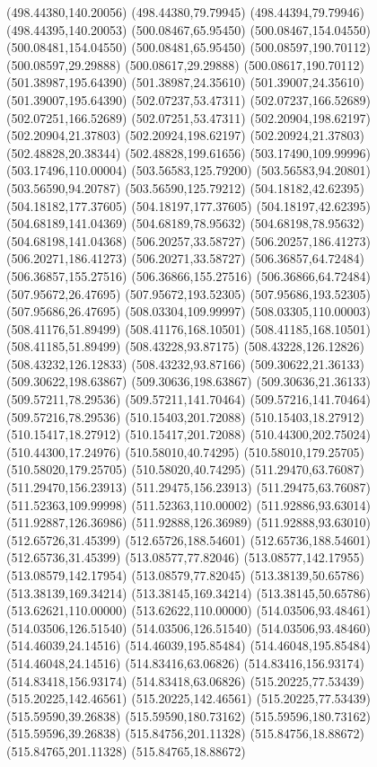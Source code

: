 {(498.44380,140.20056) (498.44380,79.79945) (498.44394,79.79946) (498.44395,140.20053) (500.08467,65.95450) (500.08467,154.04550) (500.08481,154.04550) (500.08481,65.95450)
(500.08597,190.70112) (500.08597,29.29888) (500.08617,29.29888) (500.08617,190.70112) (501.38987,195.64390) (501.38987,24.35610) (501.39007,24.35610) (501.39007,195.64390)
(502.07237,53.47311) (502.07237,166.52689) (502.07251,166.52689) (502.07251,53.47311) (502.20904,198.62197) (502.20904,21.37803) (502.20924,198.62197) (502.20924,21.37803)
(502.48828,20.38344) (502.48828,199.61656) (503.17490,109.99996) (503.17496,110.00004) (503.56583,125.79200) (503.56583,94.20801) (503.56590,94.20787) (503.56590,125.79212)
(504.18182,42.62395) (504.18182,177.37605) (504.18197,177.37605) (504.18197,42.62395) (504.68189,141.04369) (504.68189,78.95632) (504.68198,78.95632) (504.68198,141.04368)
(506.20257,33.58727) (506.20257,186.41273) (506.20271,186.41273) (506.20271,33.58727) (506.36857,64.72484) (506.36857,155.27516) (506.36866,155.27516) (506.36866,64.72484)
(507.95672,26.47695) (507.95672,193.52305) (507.95686,193.52305) (507.95686,26.47695) (508.03304,109.99997) (508.03305,110.00003) (508.41176,51.89499) (508.41176,168.10501)
(508.41185,168.10501) (508.41185,51.89499) (508.43228,93.87175) (508.43228,126.12826) (508.43232,126.12833) (508.43232,93.87166) (509.30622,21.36133) (509.30622,198.63867)
(509.30636,198.63867) (509.30636,21.36133) (509.57211,78.29536) (509.57211,141.70464) (509.57216,141.70464) (509.57216,78.29536) (510.15403,201.72088) (510.15403,18.27912)
(510.15417,18.27912) (510.15417,201.72088) (510.44300,202.75024) (510.44300,17.24976) (510.58010,40.74295) (510.58010,179.25705) (510.58020,179.25705) (510.58020,40.74295)
(511.29470,63.76087) (511.29470,156.23913) (511.29475,156.23913) (511.29475,63.76087) (511.52363,109.99998) (511.52363,110.00002) (511.92886,93.63014) (511.92887,126.36986)
(511.92888,126.36989) (511.92888,93.63010) (512.65726,31.45399) (512.65726,188.54601) (512.65736,188.54601) (512.65736,31.45399) (513.08577,77.82046) (513.08577,142.17955)
(513.08579,142.17954) (513.08579,77.82045) (513.38139,50.65786) (513.38139,169.34214) (513.38145,169.34214) (513.38145,50.65786) (513.62621,110.00000) (513.62622,110.00000)
(514.03506,93.48461) (514.03506,126.51540) (514.03506,126.51540) (514.03506,93.48460) (514.46039,24.14516) (514.46039,195.85484) (514.46048,195.85484) (514.46048,24.14516)
(514.83416,63.06826) (514.83416,156.93174) (514.83418,156.93174) (514.83418,63.06826) (515.20225,77.53439) (515.20225,142.46561) (515.20225,142.46561) (515.20225,77.53439)
(515.59590,39.26838) (515.59590,180.73162) (515.59596,180.73162) (515.59596,39.26838) (515.84756,201.11328) (515.84756,18.88672) (515.84765,201.11328) (515.84765,18.88672)
}
